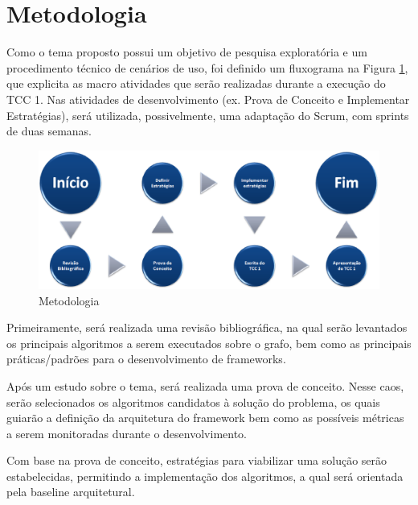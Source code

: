 \section*{Metodologia}
\label{sec:metodologia}


Como o tema proposto possui um objetivo de pesquisa exploratória e um procedimento técnico de cenários de uso, foi definido um fluxograma na Figura \ref{Metodologia}, que explicita as macro atividades que serão realizadas durante a execução do TCC 1. Nas atividades de desenvolvimento (ex. Prova de Conceito e Implementar Estratégias), será utilizada, possivelmente, uma adaptação do Scrum, com sprints de duas semanas.

\begin{figure}[!h]
	\centering
	\includegraphics[scale=0.5]{figuras/metodologia.eps}
	\caption{Metodologia}
	\label{Metodologia}
\end{figure}

Primeiramente, será realizada uma revisão bibliográfica, na qual serão levantados os principais algoritmos a serem executados sobre o grafo, bem como as principais práticas/padrões para o desenvolvimento de frameworks.

Após um estudo sobre o tema, será realizada uma prova de conceito. Nesse caos, serão selecionados os algoritmos candidatos à solução do problema, os quais guiarão a definição da arquitetura do framework bem como as possíveis métricas a serem monitoradas durante o desenvolvimento.

Com base na prova de conceito, estratégias para viabilizar uma solução serão estabelecidas, permitindo a implementação dos algoritmos, a qual será orientada pela baseline arquitetural.

